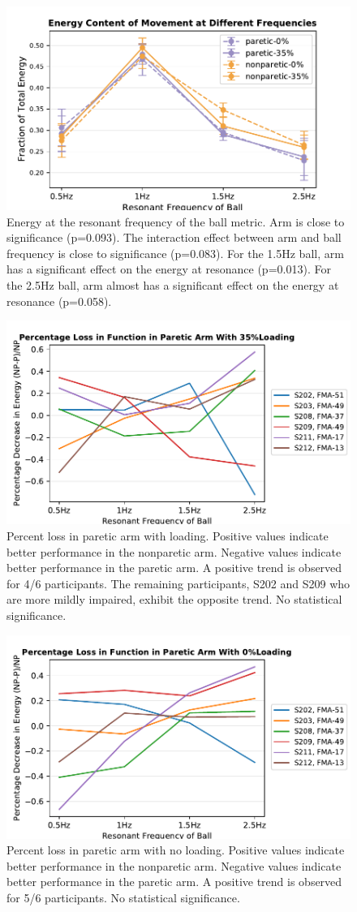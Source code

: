 \documentclass{article}
\begin{document}
\begin{figure}[!ht]
     \centering
     \includegraphics[width=0.5\linewidth]{Plots/e_at_res_raw.pdf}
	\caption{Energy at the resonant frequency of the ball metric. Arm is close to significance (p=0.093). The interaction effect between arm and ball frequency is close to significance (p=0.083). For the 1.5Hz ball, arm has a significant effect on the energy at resonance (p=0.013). For the 2.5Hz ball, arm almost has a significant effect on the energy at resonance (p=0.058).}
\end{figure}


\begin{figure}[!ht]
     \centering
     \includegraphics[width=0.5\linewidth]{Plots/pl_SL1_seperate.pdf}
	\caption{Percent loss in paretic arm with loading. Positive values indicate better performance in the nonparetic arm. Negative values indicate better performance in the paretic arm. A positive trend is observed for 4/6 participants. The remaining participants, S202 and S209 who are more mildly impaired, exhibit the opposite trend. No statistical significance.}
\end{figure}

\begin{figure}[!ht]
     \centering
     \includegraphics[width=0.5\linewidth]{Plots/pl_SL0_seperate.pdf}
	\caption{Percent loss in paretic arm with no loading. Positive values indicate better performance in the nonparetic arm. Negative values indicate better performance in the paretic arm. A positive trend is observed for 5/6 participants. No statistical significance.}
\end{figure}
\end{document}
